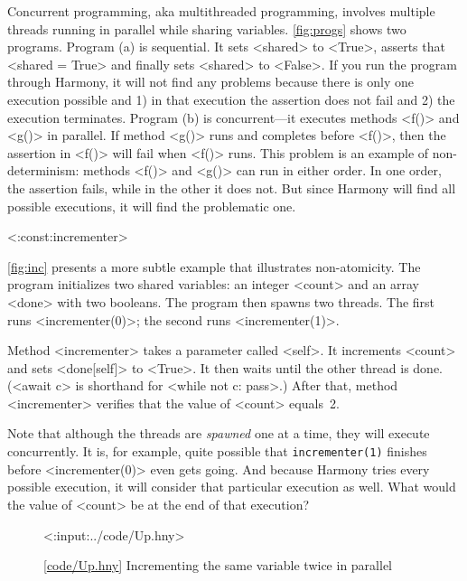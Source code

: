 \documentclass{report}
\newcommand{\harmonylink}[1]{%
[\href{https://harmony.cs.cornell.edu/#1}{\underline{#1}}]%
}
\newenvironment{code}{
\tcolorbox
}{
\endtcolorbox
}
\begin{document}
%

Concurrent programming, aka multithreaded programming, involves multiple
threads
%
running in parallel while sharing variables.
\autoref{fig:progs} shows two programs.  Program (a) is sequential.
It sets <{shared}> to <{True}>, asserts that
<{shared = True}> and finally sets <{shared}> to <{False}>.
If you run the program through Harmony, it will not find any problems
because there is only one execution possible and 1) in that execution
the assertion does not fail and 2) the execution terminates.
Program (b) is concurrent---it executes methods <{f()}> and
<{g()}> in parallel.
If method <{g()}> runs and completes before <{f()}>, then
the assertion in <{f()}> will fail when <{f()}> runs.
This problem is an example of non-determinism: methods <{f()}>
and <{g()}> can run in either order.
In one order, the assertion fails, while in the other it does not.
But since Harmony will find all possible executions, it will find
the problematic one.

<{:const:incrementer}>

\autoref{fig:inc} presents a more subtle example that illustrates
non-atomicity.
The program initializes two shared variables:
an integer <{count}> and
an array <{done}> with two booleans.
The program then spawns two threads.
The first runs <{incrementer(0)}>; the second runs <{incrementer(1)}>.

Method <{incrementer}> takes a parameter called <{self}>.
It increments <{count}> and sets <{done[self]}> to <{True}>.
It then waits until the other thread is done.
(<{await c}> is shorthand for <{while not c: pass}>.)
After that, method <{incrementer}>
verifies that the value of <{count}> equals~2.

Note that although the threads are \emph{spawned} one at a time,
they will execute concurrently.  It is, for example, quite possible
that \texttt{incrementer(1)} finishes before <{incrementer(0)}>
even gets going.
And because Harmony tries every possible execution, it will consider
that particular execution as well.
What would the value of <{count}> be at the end of that execution?

\begin{figure}[h]
\begin{code}
<{:input:../code/Up.hny}>
\end{code}
\caption{\harmonylink{code/Up.hny} Incrementing the same variable twice in parallel}
\label{fig:inc}
\end{figure}
\end{document}
